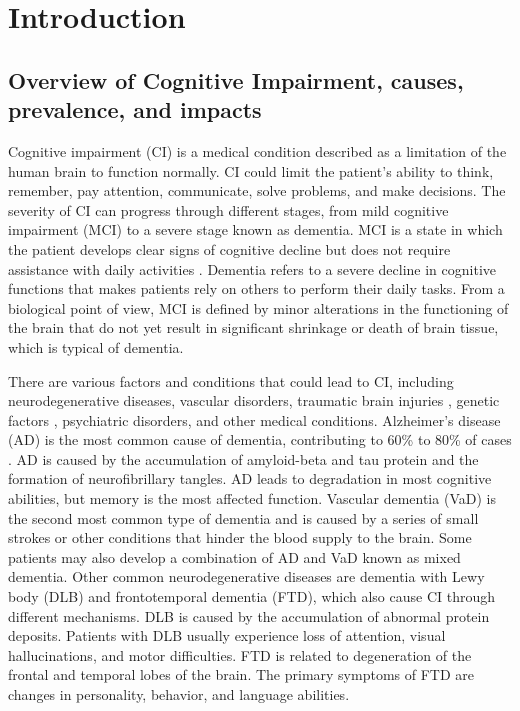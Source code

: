 \chapter{Introduction}

\section{Overview of Cognitive Impairment, causes, prevalence, and impacts}
Cognitive impairment (\acrshort{CI}) is a medical condition described as a limitation of the human brain to function normally. CI could limit the patient's ability to think, remember, pay attention, communicate, solve problems, and make decisions. The severity of CI can progress through different stages, from mild cognitive impairment (\acrshort{MCI}) to a severe stage known as dementia. MCI is a state in which the patient develops clear signs of cognitive decline but does not require assistance with daily activities \cite{Knopman2014Mild}. Dementia refers to a severe decline in cognitive functions that makes patients rely on others to perform their daily tasks. From a biological point of view, MCI is defined by minor alterations in the functioning of the brain that do not yet result in significant shrinkage or death of brain tissue, which is typical of dementia.

There are various factors and conditions that could lead to CI, including neurodegenerative diseases, vascular disorders, traumatic brain injuries \cite{Nordström2018Traumatic}, genetic factors \cite{Loy2014Genetics}, psychiatric disorders, and other medical conditions. Alzheimer’s disease (\acrshort{AD}) \cite{Scheltens2021Alzheimer} is the most common cause of dementia, contributing to 60\% to 80\% of cases \cite{Alzheimer2024}. AD is caused by the accumulation of amyloid-beta and tau protein and the formation of neurofibrillary tangles. AD leads to degradation in most cognitive abilities, but memory is the most affected function. Vascular dementia (\acrshort{VaD}) is the second most common type of dementia and is caused by a series of small strokes or other conditions that hinder the blood supply to the brain. Some patients may also develop a combination of AD and VaD known as mixed dementia. Other common neurodegenerative diseases are dementia with Lewy body (\acrshort{DLB}) and frontotemporal dementia (\acrshort{FTD}), which also cause CI through different mechanisms. DLB is caused by the accumulation of abnormal protein deposits. Patients with DLB usually experience loss of attention, visual hallucinations, and motor difficulties. FTD is related to degeneration of the frontal and temporal lobes of the brain. The primary symptoms of FTD are changes in personality, behavior, and language abilities.


